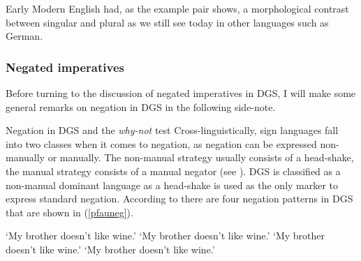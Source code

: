 \noindent Early Modern English had, as the example pair shows, a morphological contrast between singular and plural as we still see today in other languages such as German. 

\subsubsection{Negated imperatives}
Before turning to the discussion of negated imperatives in DGS, I will make some general remarks on negation in DGS in the following side-note.\label{negationnegaation}


\begin{digression}{Negation in DGS and the \textit{why-not} test}{}
\noindent Cross-linguistically, sign languages fall into two classes when it comes to negation, as negation can be expressed non-manually or manually. The non-manual strategy usually consists of a head-shake, the manual strategy consists of a manual negator (see \citealt{zeshan2004negation}). DGS is classified as a non-manual dominant language as a head-shake is used as the only marker to express standard negation. According to \citet[55]{pfau2016featural} there are four negation patterns in DGS that are shown in (\ref{pfauneg}). 


\begin{exe}
\ex\label{pfauneg}\begin{xlist} 
\ex {} 
\glt `My brother doesn't like wine.' \label{pfaunega}
\ex {} 
%
\glt `My brother doesn't like wine.' \label{pfaunegb}
\ex {} 
%
\glt `My brother doesn't like wine.' \label{pfaunegc}
\ex {} 
%
\glt `My brother doesn't like wine.' \label{pfaunegd}



\end{xlist}
\end{exe}
\end{digression}
